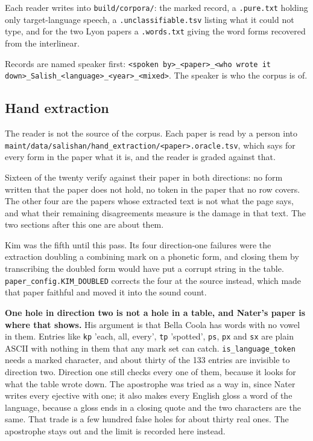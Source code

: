 Each reader writes into \texttt{build/\allowbreak{}corpora/\allowbreak{}}: the marked record, a \texttt{.\allowbreak{}pure.\allowbreak{}txt} holding only target-language speech, a \texttt{.\allowbreak{}unclassifiable.\allowbreak{}tsv} listing what it could not type, and for the two Lyon papers a \texttt{.\allowbreak{}words.\allowbreak{}txt} giving the word forms recovered from the interlinear.

Records are named speaker first: \texttt{<spoken by>\_\allowbreak{}<paper>\_\allowbreak{}<who wrote it down>\_\allowbreak{}Salish\_\allowbreak{}<language>\_\allowbreak{}<year>\_\allowbreak{}<mixed>}. The speaker is who the corpus is of.

\subsection{Hand extraction}

The reader is not the source of the corpus. Each paper is read by a person into \texttt{maint/\allowbreak{}data/\allowbreak{}salishan/\allowbreak{}hand\_\allowbreak{}extraction/\allowbreak{}<paper>.\allowbreak{}oracle.\allowbreak{}tsv}, which says for every form in the paper what it is, and the reader is graded against that.

Sixteen of the twenty verify against their paper in both directions: no form written that the paper does not hold, no token in the paper that no row covers. The other four are the papers whose extracted text is not what the page says, and what their remaining disagreements measure is the damage in that text. The two sections after this one are about them.

Kim was the fifth until this pass. Its four direction-one failures were the extraction doubling a combining mark on a phonetic form, and closing them by transcribing the doubled form would have put a corrupt string in the table. \texttt{paper\_\allowbreak{}config.\allowbreak{}KIM\_\allowbreak{}DOUBLED} corrects the four at the source instead, which made that paper faithful and moved it into the sound count.

\textbf{One hole in direction two is not a hole in a table, and Nater's paper is where that shows.} His argument is that Bella Coola has words with no vowel in them. Entries like \texttt{kp} 'each, all, every', \texttt{tp} 'spotted', \texttt{ps}, \texttt{px} and \texttt{sx} are plain ASCII with nothing in them that any mark set can catch. \texttt{is\_\allowbreak{}language\_\allowbreak{}token} needs a marked character, and about thirty of the 133 entries are invisible to direction two. Direction one still checks every one of them, because it looks for what the table wrote down. The apostrophe was tried as a way in, since Nater writes every ejective with one; it also makes every English gloss a word of the language, because a gloss ends in a closing quote and the two characters are the same. That trade is a few hundred false holes for about thirty real ones. The apostrophe stays out and the limit is recorded here instead.


